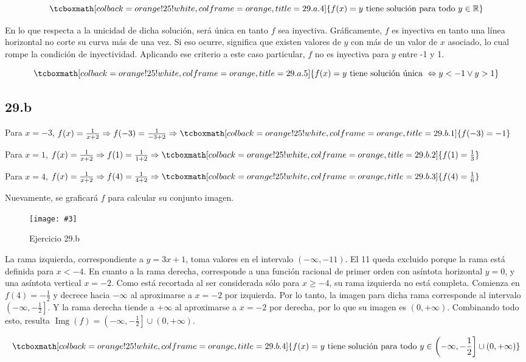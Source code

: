 \documentclass{article}
\newcommand{\hresult}[2]{\tcboxmath[colback=orange!25!white,colframe=orange, title=#1] {#2} }
\newcommand{\figurex}[4]{\begin{figure}[ht] \caption{#1} \texttt{[image: \#3]} \centering \label{#4}\end{figure}}
\newcommand{\subsectionx}[1]{\subsection*{#1}\label{subsec:#1}\addcontentsline{toc}{subsection}{\nameref{subsec:#1}}}
\begin{document}
\begin{equation}
\hresult{29.a.4}{ f(x) = y \text{ tiene solución para todo } y \in \mathbb{R} }
\end{equation}

En lo que respecta a la unicidad de dicha solución, será única en tanto $ f $ sea inyectiva. Gráficamente, $ f $ es inyectiva en tanto una línea horizontal no corte su curva más de una vez. Si eso ocurre, significa que existen valores de $ y $ con más de un valor de $ x $ asociado, lo cual rompe la condición de inyectividad. Aplicando ese criterio a este caso particular, $ f $ no es inyectiva para $ y $ entre -1 y 1.

\begin{equation}
\hresult{29.a.5}{ f(x) = y \text{ tiene solución única } \Leftrightarrow y < -1 \vee y > 1 }
\end{equation}

\subsectionx{29.b}

Para $x = -3$, $ f(x) = \frac{1}{x+2} \Rightarrow f(-3) = \frac{1}{-3+2} \Rightarrow \hresult{29.b.1}{ f(-3) = -1 } $

Para $x = 1$, $ f(x) = \frac{1}{x+2} \Rightarrow f(1) = \frac{1}{1+2} \Rightarrow \hresult{29.b.2}{ f(1) = \frac{1}{3} } $

Para $x = 4$, $ f(x) = \frac{1}{x+2} \Rightarrow f(4) = \frac{1}{4+2} \Rightarrow \hresult{29.b.3}{ f(4) = \frac{1}{6} } $

Nuevamente, se graficará $ f $ para calcular su conjunto imagen.

\figurex{Ejercicio 29.b}{1}{../img/guide_01/ex_29b.png}{fig:29b}

La rama izquierda, correspondiente a $ y = 3x+1 $, toma valores en el intervalo $(-\infty, -11)$. El 11 queda excluido porque la rama está definida para $ x < -4 $. En cuanto a la rama derecha, corresponde a una función racional de primer orden con asíntota horizontal $ y = 0 $, y una asíntota vertical $ x = -2 $. Como está recortada al ser considerada sólo para $ x \geq -4 $, su rama izquierda no está completa. Comienza en $ f(4) = -\frac{1}{2} $ y decrece hacia $-\infty$ al aproximarse a $ x = -2 $ por izquierda. Por lo tanto, la imagen para dicha rama corresponde al intervalo $ \left(-\infty, -\frac{1}{2} \right]$. Y la rama derecha tiende a $+\infty$ al aproximarse a $ x = -2 $ por derecha, por lo que su imagen es $(0, +\infty)$. Combinando todo esto, resulta $ \mathop{\text{Img}}(f) = \left(-\infty, -\frac{1}{2} \right] \cup (0, +\infty) $.

\begin{equation}
\hresult{29.b.4}{ f(x) = y \text{ tiene solución para todo } y \in \left(-\infty, -\frac{1}{2} \right] \cup (0, +\infty) }
\end{equation}
\end{document}
